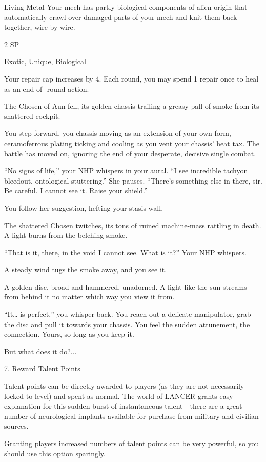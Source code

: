 Living Metal
Your mech has partly biological components of alien origin that automatically crawl over damaged
parts of your mech and knit them back together, wire by wire.




2 SP

Exotic, Unique, Biological

Your repair cap increases by 4. Each round, you may spend 1 repair once to heal as an end-of-
round action.


The Chosen of Aun fell, its golden chassis trailing a greasy pall of smoke from its shattered
cockpit.

You step forward, you chassis moving as an extension of your own form, ceramoferrous plating
ticking and cooling as you vent your chassis’ heat tax. The battle has moved on, ignoring the end
of your desperate, decisive single combat.

“No signs of life,” your NHP whispers in your aural. “I see incredible tachyon bleedout,
ontological stuttering.” She pauses. “There’s something else in there, sir. Be careful. I cannot see
it. Raise your shield.”

You follow her suggestion, hefting your stasis wall.

The shattered Chosen twitches, its tons of ruined machine-mass rattling in death. A light burns
from the belching smoke.

“That is it, there, in the void I cannot see. What is it?” Your NHP whispers.

A steady wind tugs the smoke away, and you see it.

A golden disc, broad and hammered, unadorned. A light like the sun streams from behind it no
matter which way you view it from.

“It… is perfect,” you whisper back. You reach out a delicate manipulator, grab the disc and pull it
towards your chassis. You feel the sudden attunement, the connection. Yours, so long as you
keep it.

But what does it do?...

7. Reward Talent Points

Talent points can be directly awarded to players (as they are not necessarily locked to level) and
spent as normal. The world of LANCER grants easy explanation for this sudden burst of
instantaneous talent - there are a great number of neurological implants available for purchase
from military and civilian sources.





Granting players increased numbers of talent points can be very powerful, so you should use this
option sparingly.

